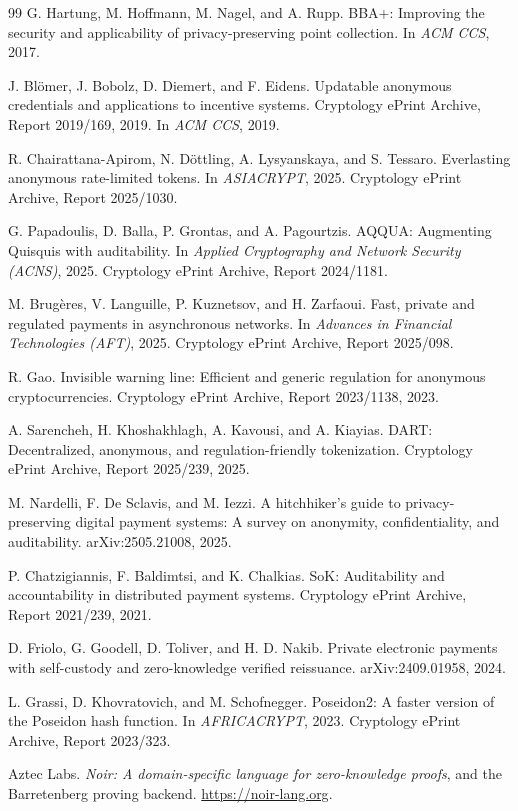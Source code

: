 \documentclass[11pt,a4paper]{article}
\theoremstyle{definition}
\theoremstyle{plain}
\theoremstyle{remark}
\begin{document}
\begin{thebibliography}{99}
G. Hartung, M. Hoffmann, M. Nagel, and A. Rupp. BBA+: Improving the security and applicability of privacy-preserving point collection. In \emph{ACM CCS}, 2017.

J. Bl\"omer, J. Bobolz, D. Diemert, and F. Eidens. Updatable anonymous credentials and applications to incentive systems. Cryptology ePrint Archive, Report 2019/169, 2019. In \emph{ACM CCS}, 2019.

R. Chairattana-Apirom, N. D\"ottling, A. Lysyanskaya, and S. Tessaro. Everlasting anonymous rate-limited tokens. In \emph{ASIACRYPT}, 2025. Cryptology ePrint Archive, Report 2025/1030.

G. Papadoulis, D. Balla, P. Grontas, and A. Pagourtzis. AQQUA: Augmenting Quisquis with auditability. In \emph{Applied Cryptography and Network Security (ACNS)}, 2025. Cryptology ePrint Archive, Report 2024/1181.

M. Brug\`eres, V. Languille, P. Kuznetsov, and H. Zarfaoui. Fast, private and regulated payments in asynchronous networks. In \emph{Advances in Financial Technologies (AFT)}, 2025. Cryptology ePrint Archive, Report 2025/098.

R. Gao. Invisible warning line: Efficient and generic regulation for anonymous cryptocurrencies. Cryptology ePrint Archive, Report 2023/1138, 2023.

A. Sarencheh, H. Khoshakhlagh, A. Kavousi, and A. Kiayias. DART: Decentralized, anonymous, and regulation-friendly tokenization. Cryptology ePrint Archive, Report 2025/239, 2025.

M. Nardelli, F. De Sclavis, and M. Iezzi. A hitchhiker's guide to privacy-preserving digital payment systems: A survey on anonymity, confidentiality, and auditability. arXiv:2505.21008, 2025.

P. Chatzigiannis, F. Baldimtsi, and K. Chalkias. SoK: Auditability and accountability in distributed payment systems. Cryptology ePrint Archive, Report 2021/239, 2021.

D. Friolo, G. Goodell, D. Toliver, and H. D. Nakib. Private electronic payments with self-custody and zero-knowledge verified reissuance. arXiv:2409.01958, 2024.

L. Grassi, D. Khovratovich, and M. Schofnegger. Poseidon2: A faster version of the Poseidon hash function. In \emph{AFRICACRYPT}, 2023. Cryptology ePrint Archive, Report 2023/323.

Aztec Labs. \emph{Noir: A domain-specific language for zero-knowledge proofs}, and the Barretenberg proving backend. \url{https://noir-lang.org}.

\end{thebibliography}
\end{document}
